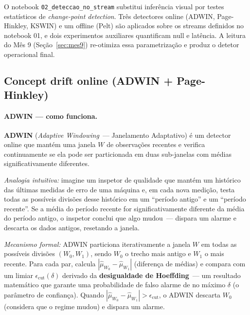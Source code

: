 \documentclass[11pt,a4paper]{article}
\begin{document}
O notebook \texttt{02\_deteccao\_no\_stream} substitui infer\^encia
visual por testes estat\'isticos de \emph{change-point detection}.
Tr\^es detectores online (ADWIN, Page-Hinkley, KSWIN) e um offline
(Pelt) s\~ao aplicados sobre os streams definidos no notebook 01,
e dois experimentos auxiliares quantificam null e lat\^encia.
A leitura do M\^es 9 (Se\c{c}\~ao~\ref{sec:mes9}) re-otimiza
essa parametriza\c{c}\~ao e produz o detetor operacional final.

\subsection{Concept drift online (ADWIN + Page-Hinkley)}
\label{sec:m2_adwin_ph}

\paragraph{ADWIN --- como funciona.}
\textbf{ADWIN} (\emph{Adaptive Windowing}~--- Janelamento Adaptativo) \cite{adwin} \'e um detector online que mant\'em uma janela $W$ de observa\c{c}\~oes recentes e verifica continuamente se ela pode ser particionada em duas sub-janelas com m\'edias significativamente diferentes.

\emph{Analogia intuitiva:} imagine um inspetor de qualidade que mant\'em um hist\'orico das \'ultimas medidas de erro de uma m\'aquina e, em cada nova medi\c{c}\~ao, testa todas as poss\'iveis divis\~oes desse hist\'orico em um ``per\'iodo antigo'' e um ``per\'iodo recente''. Se a m\'edia do per\'iodo recente for significativamente diferente da m\'edia do per\'iodo antigo, o inspetor conclui que algo mudou~--- dispara um alarme e descarta os dados antigos, resetando a janela.

\emph{Mecanismo formal:} ADWIN particiona iterativamente a janela $W$ em todas as poss\'iveis divis\~oes $(W_0, W_1)$, sendo $W_0$ o trecho mais antigo e $W_1$ o mais recente. Para cada par, calcula $|\hat\mu_{W_0} - \hat\mu_{W_1}|$ (diferen\c{c}a de m\'edias) e compara com um limiar $\epsilon_\mathrm{cut}(\delta)$ derivado da \textbf{desigualdade de Hoeffding}~--- um resultado matem\'atico que garante uma prob\-a\-bi\-li\-da\-de de falso alarme de no m\'aximo $\delta$ (o par\^ametro de confian\c{c}a). Quando $|\hat\mu_{W_0} - \hat\mu_{W_1}| > \epsilon_\mathrm{cut}$, o ADWIN descarta $W_0$ (considera que o regime mudou) e dispara um alarme.
\end{document}

